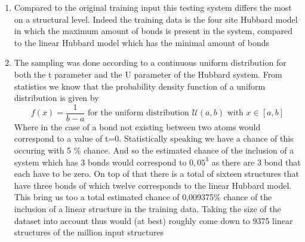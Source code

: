 \documentclass[]{article}
\begin{document}
\begin{enumerate}
\item Compared to the original training input this testing system differs the most on a structural level. Indeed the training data is the four site Hubbard model in which the maximum amount of bonds is present in the system, compared to the linear Hubbard model which has the minimal amount of bonds
\item The sampling was done according to a continuous uniform distribution for both the t parameter and the U parameter of the Hubbard system. From statistics we know that the probability density function of a uniform distribution is given by
\begin{equation*}
f(x) = \frac{1}{b-a} \text{ for the uniform distribution } \mathcal{U}(a,b) \text{ with } x \in \left[ a, b \right]
\end{equation*}
Where in the case of a bond not existing between two atoms would correspond to a value of t=0. Statistically speaking we have a chance of this occuring with 5 $\%$ chance. And so the estimated chance of the inclusion of a system which has 3 bonds would correspond to $0,05^3$ as there are 3 bond that each have to be zero. On top of that there is a total of sixteen structures that have three bonds of which twelve corresponds to the linear Hubbard model. This bring us too a total estimated chance of 0,009375$\%$ chance of the inclusion of a linear structure in the training data. Taking the size of the dataset into account thus would (at best) roughly come down to 9375 linear structures of the million input structures    
\end{enumerate}
\end{document}

